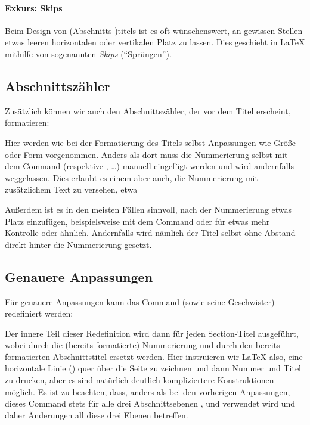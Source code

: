 \paragraph{Exkurs: Skips}
Beim Design von (Abschnitts-)titels ist es oft wünschenswert, an gewissen Stellen etwas leeren horizontalen oder vertikalen Platz zu lassen.
Dies geschieht in \LaTeX{} mithilfe von sogenannten \emph{Skips} (\enquote{Sprüngen}).

\subsection{Abschnittszähler}
Zusätzlich können wir auch den Abschnittszähler, der vor dem Titel erscheint, formatieren:
\begin{latexlisting}
\renewcommand*{\sectionformat}{\Large\scshape\thesection\qquad}	
\end{latexlisting}
Hier werden wie bei der Formatierung des Titels selbst Anpassungen wie Größe oder Form vorgenommen.
Anders als dort muss die Nummerierung selbst mit dem Command  (respektive \latexcommand{\thechapter}, \dots) manuell eingefügt werden und wird andernfalls weggelassen.
Dies erlaubt es einem aber auch, die Nummerierung mit zusätzlichem Text zu versehen, etwa
\begin{latexlisting}
\renewcommand*{\sectionformat}{\Large\scshape\thesection . Abschnitt\qquad}	
\end{latexlisting}
Außerdem ist es in den meisten Fällen sinnvoll, nach der Nummerierung etwas Platz einzufügen, beispielsweise mit dem Command  oder für etwas mehr Kontrolle  oder ähnlich.
Andernfalls wird nämlich der Titel selbst ohne Abstand direkt hinter die Nummerierung gesetzt.

\subsection{Genauere Anpassungen}
Für genauere Anpassungen kann das Command  (sowie seine Geschwister) redefiniert werden:
\begin{latexlisting}
	\renewcommand{\sectionlinesformat}[4]{%
	  \rule[-.15\baselineskip]{\linewidth}{.5pt}\par\nobreak%
	  #3%
	  #4%
	}
\end{latexlisting}
Der innere Teil dieser Redefinition wird dann für jeden Section-Titel ausgeführt, wobei  durch die (bereits formatierte) Nummerierung und  durch den bereits formatierten Abschnittstitel ersetzt werden.
Hier instruieren wir \LaTeX{} also, eine horizontale Linie () quer über die Seite zu zeichnen und dann Nummer und Titel zu drucken, aber es sind natürlich deutlich kompliziertere Konstruktionen möglich.
Es ist zu beachten, dass, anders als bei den vorherigen Anpassungen, dieses Command stets für alle drei Abschnittsebenen ,  und  verwendet wird und daher Änderungen all diese drei Ebenen betreffen.

